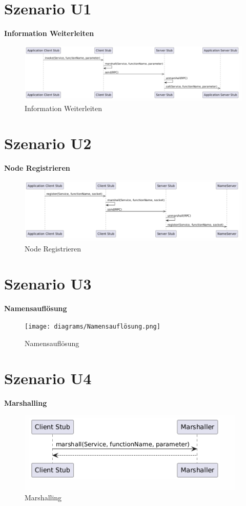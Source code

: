\section{Szenario U1}
\textbf{Information Weiterleiten}\\
\begin{figure}[h]
    \centering
    \includegraphics[width=0.8\linewidth]{diagrams/Information_Weiterleiten.png}
    \caption{Information Weiterleiten}
    \label{fig:Information_Weiterleiten}
\end{figure}


\section{Szenario U2}
\textbf{Node Registrieren}\\
\begin{figure}[h]
    \centering
    \includegraphics[width=0.8\linewidth]{diagrams/Node_Registrieren.png}
    \caption{Node Registrieren}
    \label{fig:Node_Registrieren}
\end{figure}

\section{Szenario U3}
\textbf{Namensauflösung}\\
\begin{figure}[h]
    \centering
    \texttt{[image: diagrams/Namensauflösung.png]}
    \caption{Namensauflösung}
    \label{fig:Namensauflösung}
\end{figure}


\section{Szenario U4}
\textbf{Marshalling}\\
\begin{figure}[h]
    \centering
    \includegraphics[width=0.8\linewidth]{diagrams/Marshalling.png}
    \caption{Marshalling}
    \label{fig:Marshalling}
\end{figure}


